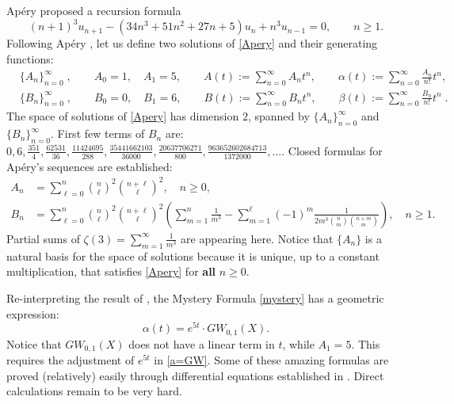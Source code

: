 \documentclass{amsart}
\theoremstyle{definition}
\numberwithin{equation}{section}
\numberwithin{figure}{section}
\def\a{\alpha}
\def\b{\beta}
\newcommand{\be}{\begin{equation}}
\newcommand{\ee}{\end{equation}}
\begin{document}
Ap\'ery proposed a recursion formula
\be
\label{Apery}
(n+1)^3 u_{n+1} -(34n^3+51n^2+27n+5)u_n +n^3 u_{n-1}=0, \qquad n\ge 1.
\ee
Following Ap\'ery \cite{A}, 
let us define two solutions of \eqref{Apery} and their generating functions: 
\begin{align}
\label{A}
& \{A_n\}_{n=0}^\infty\;, \qquad A_0=1, \quad A_1=5, 
\qquad A(t):=\sum_{n=0}^\infty A_n t^n, \qquad \a(t):=\sum_{n=0}^\infty 
\frac{A_n}{n!} t^n,\\
 \label{B}
&\{B_n\}_{n=0}^\infty\;, \qquad B_0=0, \quad B_1=6,
\qquad B(t):=\sum_{n=0}^\infty B_n t^n,\qquad \b(t):=\sum_{n=0}^\infty 
\frac{B_n}{n!} t^n\;.
\end{align}
The space of solutions of \eqref{Apery} has dimension $2$, spanned by 
$ \{A_n\}_{n=0}^\infty$
and  $\{B_n\}_{n=0}^\infty$. First few terms of $B_n$ are:
$0,6,\frac{351}{4},\frac{62531}{36}, \frac{11424695}{288},
\frac{35441662103}{36000},\frac{20637706271}{800}, 
\frac{963652602684713}{1372000},\dots.$ 
Closed formulas for Ap\'ery's  sequences are established:
\begin{align}
\label{An}
A_n &=\sum_{\ell=0}^n\binom{n}{\ell}^2 \binom{n+\ell}{\ell}^2, \quad n\ge 0,
\\
\label{Bn}
B_n &=\sum_{\ell=0}^n\binom{n}{\ell}^2 \binom{n+\ell}{\ell}^2
\left(\sum_{m=1}^n\frac{1}{m^3} 
- \sum_{m=1}^\ell (-1)^m\frac{1}{2m^3 \binom{n}{m}\binom{n+m}{m}}
\right), \quad n\ge 1.
\end{align}
Partial sums of $\zeta(3)=\sum_{m=1}^\infty\frac{1}{m^3}$ are appearing
here.
Notice  that $\{A_n\}$ is a natural basis for the space of solutions
because it is unique, up to a constant multiplication, that satisfies
\eqref{Apery} for \textbf{all} $n\ge 0$. 

Re-interpreting the result of  \cite{CCGK, GZ, Zagier}, 
the Mystery Formula \eqref{mystery} has a geometric
expression:
\be
\label{a=GW}
\a(t) = e^{5t}\cdot GW_{0,1}(X).
\ee
Notice that $GW_{0,1}(X)$ does not have a linear term in $t$, while 
$A_1=5$. This requires the adjustment of $e^{5t}$ in \eqref{a=GW}.
Some of  these amazing formulas are proved (relatively) easily
through differential equations established in \cite{B, BP,CCGK,GZ}.
Direct calculations remain to be very hard.
\end{document}
